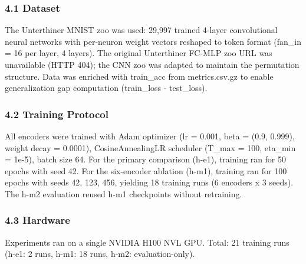 
\subsubsection{4.1 Dataset}

The Unterthiner MNIST zoo was used: 29,997 trained 4-layer convolutional neural networks with per-neuron weight vectors reshaped to token format (fan\_in = 16 per layer, 4 layers). The original Unterthiner FC-MLP zoo URL was unavailable (HTTP 404); the CNN zoo was adapted to maintain the permutation structure. Data was enriched with train\_acc from metrics.csv.gz to enable generalization gap computation (train\_loss - test\_loss).

\begin{table}[htbp]
\centering
{}
\end{table}

\subsubsection{4.2 Training Protocol}

All encoders were trained with Adam optimizer (lr = 0.001, beta = (0.9, 0.999), weight decay = 0.0001), CosineAnnealingLR scheduler (T\_max = 100, eta\_min = 1e-5), batch size 64. For the primary comparison (h-e1), training ran for 50 epochs with seed 42. For the six-encoder ablation (h-m1), training ran for 100 epochs with seeds {42, 123, 456}, yielding 18 training runs (6 encoders x 3 seeds). The h-m2 evaluation reused h-m1 checkpoints without retraining.

\subsubsection{4.3 Hardware}

Experiments ran on a single NVIDIA H100 NVL GPU. Total: 21 training runs (h-e1: 2 runs, h-m1: 18 runs, h-m2: evaluation-only).
